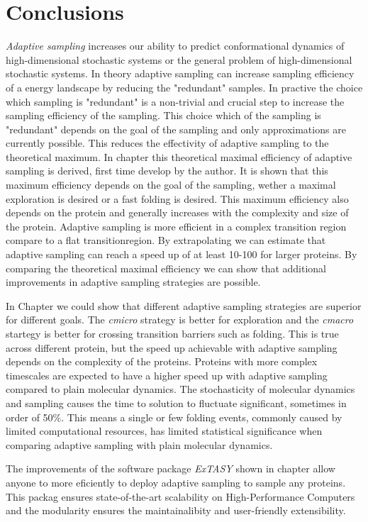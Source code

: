 \afterpage{\null\newpage}
\chapter{Conclusions}
\label{ch:conclude}
\emph{Adaptive sampling} increases our ability to predict conformational dynamics of high-dimensional stochastic systems or the general problem of high-dimensional stochastic systems. 
In theory adaptive sampling can increase sampling efficiency of a energy landscape by reducing the "redundant" samples. In practive the choice which sampling is "redundant" is a non-trivial and crucial step to increase the sampling efficiency of the sampling. This choice which of the sampling is "redundant" depends on the goal of the sampling and only approximations are currently possible. This reduces the effectivity of adaptive sampling to the theoretical maximum. 
In chapter \label{ch:chapter3} this theoretical maximal efficiency of adaptive sampling is derived, first time develop by the author. It is shown that this maximum efficiency depends on the goal of the sampling, wether a maximal exploration is desired or a fast folding is desired. This maximum efficiency also depends on the protein and generally increases with the complexity and size of the protein. Adaptive sampling is more efficient in a complex transition region compare to a flat transitionregion. By extrapolating we can estimate that adaptive sampling can reach a speed up of at least 10-100 for larger proteins. By comparing the theoretical maximal efficiency we can show that additional improvements in adaptive sampling strategies are possible.

In Chapter \label{ch:chapter32} we could show that different adaptive sampling strategies are superior for different goals. The \emph{cmicro} strategy is better for exploration and the \emph{cmacro} startegy is better for crossing transition barriers such as folding. This is true across different protein, but the speed up achievable with adaptive sampling depends on the complexity of the proteins. Proteins with more complex timescales are expected to have a higher speed up with adaptive sampling compared to plain molecular dynamics. The stochasticity of molecular dynamics and sampling causes the time to solution to fluctuate significant, sometimes in order of 50\%. This means a single or few folding events, commonly caused by limited computational resources, has limited statistical significance when comparing adaptive sampling with plain molecular dynamics.

The improvements of the software package \emph{ExTASY} shown in chapter \label{ch:chapter4} allow anyone to more eficiently to deploy adaptive sampling to sample any proteins. This packag ensures state-of-the-art scalability on High-Performance Computers and the modularity ensures the maintainalibity and user-friendly extensibility.

